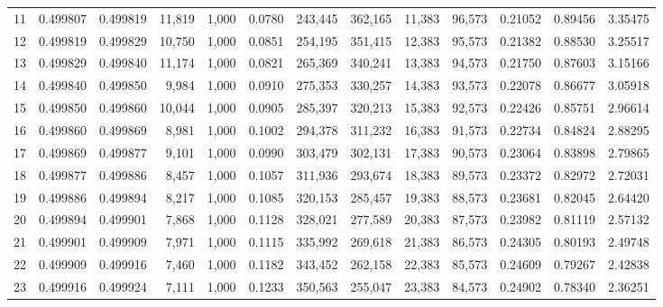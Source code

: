 \begin{tabular}{rrrrrrrrrrrrr}
11  &  0.499807 &  0.499819 &  11,819 &  1,000 &                                     0.0780 &  243,445 &  362,165 &   11,383 &   96,573 &  0.21052 &  0.89456 &  3.35475 \\
12  &  0.499819 &  0.499829 &  10,750 &  1,000 &                                     0.0851 &  254,195 &  351,415 &   12,383 &   95,573 &  0.21382 &  0.88530 &  3.25517 \\
13  &  0.499829 &  0.499840 &  11,174 &  1,000 &                                     0.0821 &  265,369 &  340,241 &   13,383 &   94,573 &  0.21750 &  0.87603 &  3.15166 \\
14  &  0.499840 &  0.499850 &   9,984 &  1,000 &                                     0.0910 &  275,353 &  330,257 &   14,383 &   93,573 &  0.22078 &  0.86677 &  3.05918 \\
15  &  0.499850 &  0.499860 &  10,044 &  1,000 &                                     0.0905 &  285,397 &  320,213 &   15,383 &   92,573 &  0.22426 &  0.85751 &  2.96614 \\
16  &  0.499860 &  0.499869 &   8,981 &  1,000 &                                     0.1002 &  294,378 &  311,232 &   16,383 &   91,573 &  0.22734 &  0.84824 &  2.88295 \\
17  &  0.499869 &  0.499877 &   9,101 &  1,000 &                                     0.0990 &  303,479 &  302,131 &   17,383 &   90,573 &  0.23064 &  0.83898 &  2.79865 \\
18  &  0.499877 &  0.499886 &   8,457 &  1,000 &                                     0.1057 &  311,936 &  293,674 &   18,383 &   89,573 &  0.23372 &  0.82972 &  2.72031 \\
19  &  0.499886 &  0.499894 &   8,217 &  1,000 &                                     0.1085 &  320,153 &  285,457 &   19,383 &   88,573 &  0.23681 &  0.82045 &  2.64420 \\
20  &  0.499894 &  0.499901 &   7,868 &  1,000 &                                     0.1128 &  328,021 &  277,589 &   20,383 &   87,573 &  0.23982 &  0.81119 &  2.57132 \\
21  &  0.499901 &  0.499909 &   7,971 &  1,000 &                                     0.1115 &  335,992 &  269,618 &   21,383 &   86,573 &  0.24305 &  0.80193 &  2.49748 \\
22  &  0.499909 &  0.499916 &   7,460 &  1,000 &                                     0.1182 &  343,452 &  262,158 &   22,383 &   85,573 &  0.24609 &  0.79267 &  2.42838 \\
23  &  0.499916 &  0.499924 &   7,111 &  1,000 &                                     0.1233 &  350,563 &  255,047 &   23,383 &   84,573 &  0.24902 &  0.78340 &  2.36251 \\

\end{tabular}
